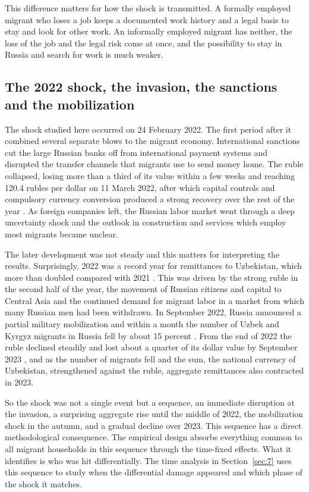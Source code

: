 This difference matters for how the shock is transmitted. A formally employed migrant who loses a job keeps a documented work history and a legal basis to stay and look for other work. An informally employed migrant has neither, the loss of the job and the legal risk come at once, and the possibility to stay in Russia and search for work is much weaker.

\subsection{The 2022 shock, the invasion, the sanctions and the mobilization}\label{sec:3-3}

The shock studied here occurred on 24 February 2022. The first period after it combined several separate blows to the migrant economy. International sanctions cut the large Russian banks off from international payment systems and disrupted the transfer channels that migrants use to send money home. The ruble collapsed, losing more than a third of its value within a few weeks and reaching 120.4 rubles per dollar on 11 March 2022, after which capital controls and compulsory currency conversion produced a strong recovery over the rest of the year \parencite{cbr2026}. As foreign companies left, the Russian labor market went through a deep uncertainty shock and the outlook in construction and services which employ most migrants became unclear.

The later development was not steady and this matters for interpreting the results. Surprisingly, 2022 was a record year for remittances to Uzbekistan, which more than doubled compared with 2021 \parencite{worldbank2023}. This was driven by the strong ruble in the second half of the year, the movement of Russian citizens and capital to Central Asia and the continued demand for migrant labor in a market from which many Russian men had been withdrawn. In September 2022, Russia announced a partial military mobilization and within a month the number of Uzbek and Kyrgyz migrants in Russia fell by about 15 percent \parencite{bossavie2024journey}. From the end of 2022 the ruble declined steadily and lost about a quarter of its dollar value by September 2023 \parencite{cbr2026}, and as the number of migrants fell and the sum, the national currency of Uzbekistan, strengthened against the ruble, aggregate remittances also contracted in 2023.

So the shock was not a single event but a sequence, an immediate disruption at the invasion, a surprising aggregate rise until the middle of 2022, the mobilization shock in the autumn, and a gradual decline over 2023. This sequence has a direct methodological consequence. The empirical design absorbs everything common to all migrant households in this sequence through the time-fixed effects. What it identifies is who was hit differentially. The time analysis in Section~\ref{sec:7} uses this sequence to study when the differential damage appeared and which phase of the shock it matches.

